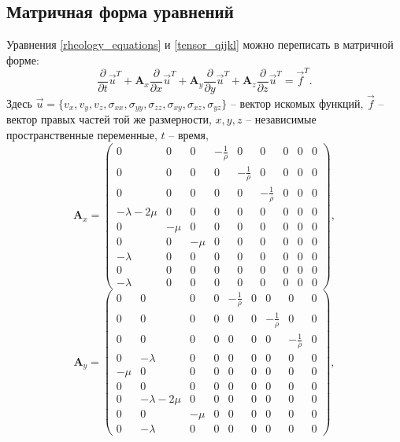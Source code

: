 \subsection{Матричная форма уравнений}
Уравнения \ref{rheology_equations} и \ref{tensor_qijkl} можно переписать в матричной
форме:
\begin{equation}
\label{matrix_equation}
\frac{\partial}{\partial{t}}\vec{u}^T+\mathbf{A}_x\frac{\partial}{\partial{x}}\vec{u}^T+
\mathbf{A}_y\frac{\partial}{\partial{y}}\vec{u}^T+
\mathbf{A}_z\frac{\partial}{\partial{z}}\vec{u}^T=\vec{f}^T.
\end{equation}
Здесь
$\vec{u}=\{v_x,v_y,v_z,\sigma_{xx},\sigma_{yy},\sigma_{zz},\sigma_{xy},\sigma_{xz},\sigma_{yz}\}$
-- вектор искомых функций, $\vec{f}$ -- вектор правых частей той же размерности,
$x,y,z$ --  независимые пространственные переменные, $t$ -- время,
\begin{displaymath}
\mathbf{A}_x =
\left( \begin{array}{cccccccccccc}
0 & 0 & 0 & -\frac 1 \rho & 0 & 0 & 0 & 0 & 0 \\ 
0 & 0 & 0 & 0 & -\frac 1 \rho & 0 & 0 & 0 & 0 \\ 
0 & 0 & 0 & 0 & 0 & -\frac 1 \rho & 0 & 0 & 0 \\ 
-\lambda-2\mu & 0 & 0 & 0 & 0 & 0 & 0 & 0 & 0 \\ 
0 & -\mu & 0 & 0 & 0 & 0 & 0 & 0 & 0 \\ 
0 & 0 & -\mu & 0 & 0 & 0 & 0 & 0 & 0 \\ 
-\lambda & 0 & 0 & 0 & 0 & 0 & 0 & 0 & 0 \\ 
0 & 0 & 0 & 0 & 0 & 0 & 0 & 0 & 0 \\ 
-\lambda & 0 & 0 & 0 & 0 & 0 & 0 & 0 & 0  
\end{array} \right),
\end{displaymath} 
\begin{displaymath}
\mathbf{A}_y =
\left( \begin{array}{cccccccccccc}
0 & 0 & 0 & 0 & -\frac 1 \rho & 0 & 0 & 0 & 0 \\ 
0 & 0 & 0 & 0 & 0 & 0 & -\frac 1 \rho & 0 & 0 \\ 
0 & 0 & 0 & 0 & 0 & 0 & 0 & -\frac 1 \rho & 0 \\ 
0 & -\lambda & 0 & 0 & 0 & 0 & 0 & 0 & 0 \\ 
-\mu & 0 & 0 & 0 & 0 & 0 & 0 & 0 & 0 \\ 
0 & 0 & 0 & 0 & 0 & 0 & 0 & 0 & 0 \\ 
0 & -\lambda-2\mu & 0 & 0 & 0 & 0 & 0 & 0 & 0 \\ 
0 & 0 & -\mu & 0 & 0 & 0 & 0 & 0 & 0 \\ 
0 & -\lambda & 0 & 0 & 0 & 0 & 0 & 0 & 0  
\end{array} \right),
\end{displaymath}
